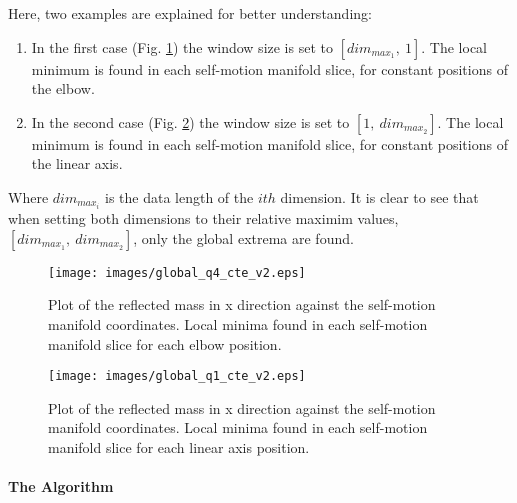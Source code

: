 Here, two examples are explained for better understanding:
\begin{enumerate}
	\item In the first case (Fig. \ref{fig:maxminfilter1}) the window size is set to $[dim_{max_{1}}, \ 1]$. The local minimum is found in each self-motion manifold slice, for constant positions of the elbow.
	\item In the second case (Fig. \ref{fig:maxminfilter2}) the window size is set to $[1, \ dim_{max_{2}}]$. The local minimum is found in each self-motion manifold slice, for constant positions of the linear axis.
	
\end{enumerate}

Where $dim_{max_{i}}$ is the data length of the $ith$ dimension. It is clear to see that when setting both dimensions to their relative maximim values, $[dim_{max_{1}}, \ dim_{max_{2}}]$, only the global extrema are found.


\begin{figure}[htb]
	\centerline{
		\texttt{[image: images/global\_q4\_cte\_v2.eps]}}
	\caption{Plot of the reflected mass in x direction against the self-motion
		manifold coordinates. Local minima found in each self-motion manifold slice for each elbow position. }
	\label{fig:maxminfilter1}
\end{figure}

\begin{figure}[htb]
	\centerline{
 		\texttt{[image: images/global\_q1\_cte\_v2.eps]}}
	\caption{ Plot of the reflected mass in x direction against the self-motion
		manifold coordinates. Local minima found in each self-motion manifold slice for each linear axis position. }
	\label{fig:maxminfilter2}
\end{figure}





\paragraph{The Algorithm}
\label{subsec:global_alg}

